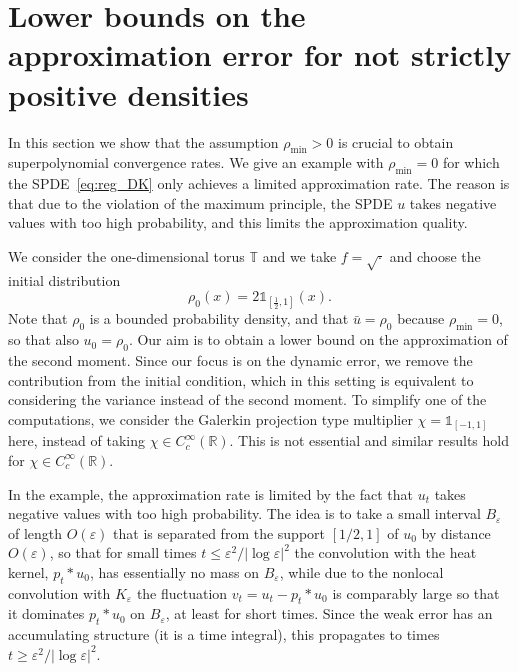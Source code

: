 \documentclass[a4paper,12pt]{article}
\newcommand{\R}{\mathbb{R}}
\begin{document}
\section{Lower bounds on the approximation error for not strictly positive densities} \label{sec:lower_bound} 

In this section we show that the assumption $\rho_{\min} > 0$ is crucial to obtain superpolynomial convergence rates. We give an example with $\rho_{\min} = 0$ for which the SPDE~\eqref{eq:reg_DK} only achieves a limited approximation rate. The reason is that due to the violation of the maximum principle, the SPDE $u$ takes negative values with too high probability, and this limits the approximation quality.

We consider the one-dimensional torus $\mathbb{T}$ and we take $f=\sqrt{\cdot}$ and choose the initial distribution
 \[
 \rho_0 (x)= 2 \mathds{1}_{[\frac{1}{2},1]}(x).
 \]
Note that $\rho_0$ is a bounded probability density, and that $\bar{u}=\rho_0$ because $\rho_{\min}=0$, so that also $u_0 = \rho_0$. Our aim is to obtain a lower bound on the approximation of the second moment. Since our focus is on the dynamic error, we remove the contribution from the initial condition, which in this setting is equivalent to considering the variance instead of the second moment. To simplify one of the computations, we consider the Galerkin projection type multiplier $\chi=\mathds{1}_{[-1,1]}$ here, instead of taking $\chi \in C^\infty_c(\R)$. This is not essential and similar results hold for $\chi \in C^\infty_c(\R)$.

In the example, the approximation rate is limited by the fact that $u_t$ takes negative values with too high probability. The idea is to take a small interval $B_\varepsilon$ of length $O(\varepsilon)$ that is separated from the support $[1/2,1]$ of $u_0$ by distance $O(\varepsilon)$, so that for small times $t\leq \varepsilon^2/|\log \varepsilon|^2$ the convolution with the heat kernel, $p_t \ast u_0$, has essentially no mass on $B_\varepsilon$, while due to the nonlocal convolution with $K_\varepsilon$ the fluctuation $v_t = u_t - p_t \ast u_0$ is comparably large so that it dominates $p_t\ast u_0$ on $B_\varepsilon$, at least for short times. Since the weak error has an accumulating structure (it is a time integral), this propagates to times $t \geq \varepsilon^2/|\log \varepsilon|^2$.
\end{document}
